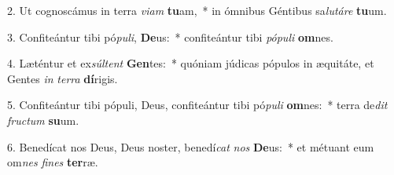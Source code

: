2. Ut cognoscámus in terra \textit{vi}\textit{am} \textbf{tu}am,~*  in ómnibus Géntibus sa\textit{lu}\textit{tá}\textit{re} \textbf{tu}um.\

3. Confiteántur tibi pó\textit{pu}\textit{li}, \textbf{De}us:~*  confiteántur tibi \textit{pó}\textit{pu}\textit{li} \textbf{om}nes.\

4. Læténtur et ex\textit{súl}\textit{tent} \textbf{Gen}tes:~*  quóniam júdicas pópulos in æquitáte, et Gentes \textit{in} \textit{ter}\textit{ra} \textbf{dí}rigis.\

5. Confiteántur tibi pópuli, Deus, confiteántur tibi pó\textit{pu}\textit{li} \textbf{om}nes:~*  terra de\textit{dit} \textit{fruc}\textit{tum} \textbf{su}um.\

6. Benedícat nos Deus, Deus noster, benedí\textit{cat} \textit{nos} \textbf{De}us:~*  et métuant eum om\textit{nes} \textit{fi}\textit{nes} \textbf{ter}ræ.\

